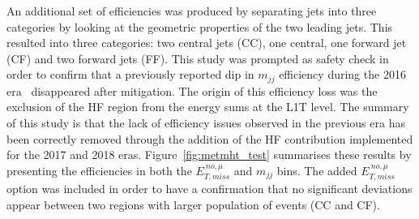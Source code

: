 \hspace{10pt} An additional set of efficiencies was produced by separating jets into three categories by looking at the geometric properties of the two leading jets. This resulted into three categories: two central jets (CC), one central, one forward jet (CF) and two forward jets (FF). This study was prompted as safety check in order to confirm that a previously reported dip in $m_{jj}$ efficiency during the 2016 era~\cite{note:AN_16_418} disappeared after mitigation. The origin of this efficiency loss was the exclusion of the HF region from the energy sums at the L1T level. The summary of this study is that the lack of efficiency issues observed in the previous era has been correctly removed through the addition of the HF contribution implemented for the 2017 and 2018 eras. Figure~\ref{fig:metmht_test} summarises these results by presenting the efficiencies in both the $E_{T,miss}^{~no,\mu}$ and $m_{jj}$ bins. The added $E_{T,miss}^{~no,\mu}$ option was included in order to have a confirmation that no significant deviations appear between two regions with larger population of events (CC and CF).


